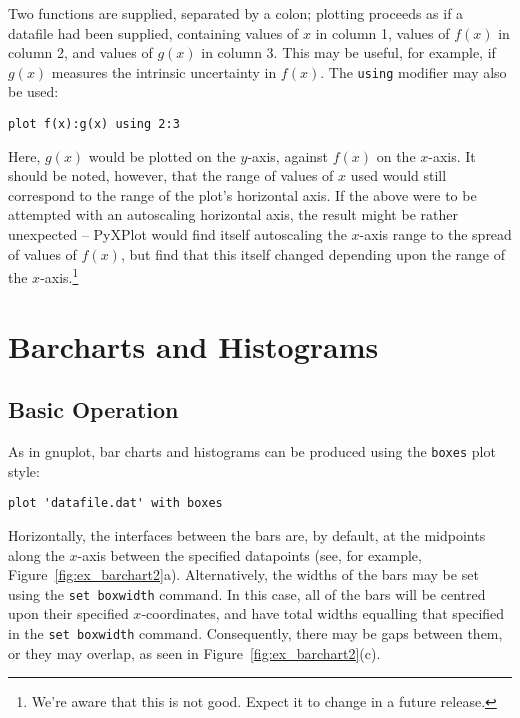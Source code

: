 \noindent Two functions are supplied, separated by a colon; plotting proceeds
as if a datafile had been supplied, containing values of $x$ in column 1,
values of $f(x)$ in column 2, and values of $g(x)$ in column 3. This may be
useful, for example, if $g(x)$ measures the intrinsic uncertainty in $f(x)$.
The \texttt{using} modifier may also be used:

\begin{verbatim}
plot f(x):g(x) using 2:3
\end{verbatim}

Here, $g(x)$ would be plotted on the $y$-axis, against $f(x)$ on the $x$-axis.
It should be noted, however, that the range of values of $x$ used would still
correspond to the range of the plot's horizontal axis. If the above were to be
attempted with an autoscaling horizontal axis, the result might be rather
unexpected -- PyXPlot would find itself autoscaling the $x$-axis range to the
spread of values of $f(x)$, but find that this itself changed depending upon
the range of the $x$-axis.\footnote{We're aware that this is not good. Expect
it to change in a future release.}

\section{Barcharts and Histograms}
\label{barcharts}

\subsection{Basic Operation}

As in gnuplot, bar charts and histograms can be produced using the
\texttt{boxes} plot style:

\begin{verbatim} 
plot 'datafile.dat' with boxes
\end{verbatim}

\noindent Horizontally, the interfaces between the bars are, by default, at the
midpoints along the $x$-axis between the specified datapoints (see, for
example, Figure~\ref{fig:ex_barchart2}a).  Alternatively, the widths of the
bars may be set using the \texttt{set boxwidth} command. In this case, all of
the bars will be centred upon their specified $x$-coordinates, and have total
widths equalling that specified in the \texttt{set boxwidth} command.  Consequently, there may be
gaps between them, or they may overlap, as seen in
Figure~\ref{fig:ex_barchart2}(c).

